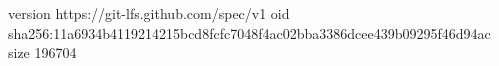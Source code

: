 version https://git-lfs.github.com/spec/v1
oid sha256:11a6934b4119214215bcd8fcfc7048f4ac02bba3386dcee439b09295f46d94ac
size 196704
